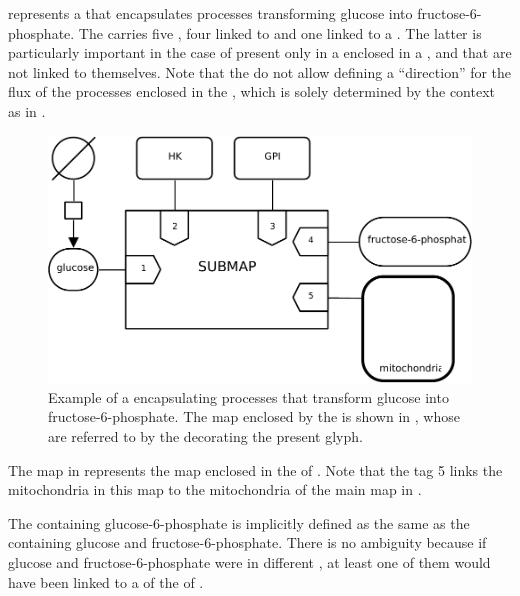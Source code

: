  represents a  that encapsulates processes transforming glucose into fructose-6-phosphate.
The  carries five , four linked to  and one linked to a .
The latter is particularly important in the case of  present only in a  enclosed in a , and that are not linked to  themselves.
Note that the  do not allow defining a ``direction'' for the flux of the processes enclosed in the , which is solely determined by the context as in .


\begin{figure}
\begin{center}
\includegraphics[scale=0.8]{images/build/submap_folded_example.pdf}
\caption{Example of a  encapsulating processes that transform glucose into fructose-6-phosphate.
The map enclosed by the  is shown in , whose  are referred to by the  decorating the present  glyph.
}
\label{fig:folded}
\end{center}
\end{figure}


The map in  represents the map enclosed in the  of .
Note that the tag 5 links the mitochondria  in this map to the mitochondria  of the main map in .

The  containing glucose-6-phosphate is implicitly defined as the same as the  containing glucose and fructose-6-phosphate.
There is no ambiguity because if glucose and fructose-6-phosphate were in different , at least one of them would have been linked to a  of the  of .


